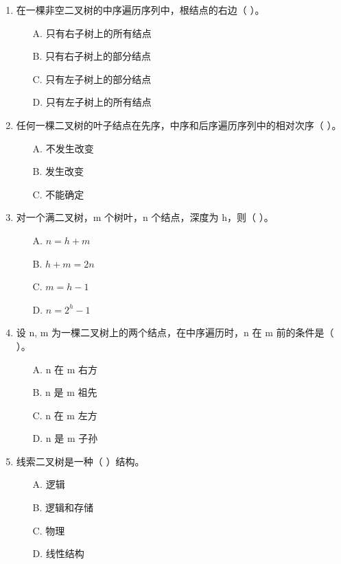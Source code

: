\documentclass[12pt, a4paper]{article}
\begin{document}
\begin{enumerate}
    \item 在一棵非空二叉树的中序遍历序列中，根结点的右边（ ）。
    \begin{enumerate}
        \item[A.] 只有右子树上的所有结点
        \item[B.] 只有右子树上的部分结点
        \item[C.] 只有左子树上的部分结点
        \item[D.] 只有左子树上的所有结点
    \end{enumerate}
    
    \item 任何一棵二叉树的叶子结点在先序，中序和后序遍历序列中的相对次序（ ）。
    \begin{enumerate}
        \item[A.] 不发生改变
        \item[B.] 发生改变
        \item[C.] 不能确定
    \end{enumerate}
    
    \item 对一个满二叉树，m 个树叶，n 个结点，深度为 h，则（ ）。
    \begin{enumerate}
        \item[A.] $n=h+m$
        \item[B.] $h+m=2n$
        \item[C.] $m=h-1$
        \item[D.] $n=2^h-1$
    \end{enumerate}
    
    \item 设 n, m 为一棵二叉树上的两个结点，在中序遍历时，n 在 m 前的条件是（ ）。
    \begin{enumerate}
        \item[A.] n 在 m 右方
        \item[B.] n 是 m 祖先
        \item[C.] n 在 m 左方
        \item[D.] n 是 m 子孙
    \end{enumerate}
    
    \item 线索二叉树是一种（ ）结构。
    \begin{enumerate}
        \item[A.] 逻辑
        \item[B.] 逻辑和存储
        \item[C.] 物理
        \item[D.] 线性结构
    \end{enumerate}
    

\end{enumerate}
\end{document}

